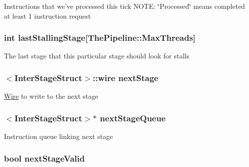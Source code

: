 \label{classPipelineStage_a4ac908fc89a76ee30c0af235353b6c2f}
Instructions that we've processed this tick NOTE: \char`\"{}Processed\char`\"{} means completed at least 1 instruction request \hypertarget{classPipelineStage_ac171ebbc339fe3c1b91878034586b7a5}{
\subsubsection[{lastStallingStage}]{\setlength{\rightskip}{0pt plus 5cm}int {\bf lastStallingStage}\mbox{[}{\bf ThePipeline::MaxThreads}\mbox{]}}}
\label{classPipelineStage_ac171ebbc339fe3c1b91878034586b7a5}
The last stage that this particular stage should look for stalls \hypertarget{classPipelineStage_a7a06bbc61668c11d11fde945df559f55}{
\subsubsection[{nextStage}]{$<${\bf InterStageStruct}$>$::wire {\bf nextStage}}}
\label{classPipelineStage_a7a06bbc61668c11d11fde945df559f55}
\hyperlink{classWire}{Wire} to write to the next stage \hypertarget{classPipelineStage_aa6321826776981dc0e21fbdeefe52016}{
\subsubsection[{nextStageQueue}]{$<${\bf InterStageStruct}$>$$\ast$ {\bf nextStageQueue}}}
\label{classPipelineStage_aa6321826776981dc0e21fbdeefe52016}
Instruction queue linking next stage \hypertarget{classPipelineStage_a74cfb32df253cbcbf5d70e6523492d2d}{
\subsubsection[{nextStageValid}]{\setlength{\rightskip}{0pt plus 5cm}bool {\bf nextStageValid}}}
